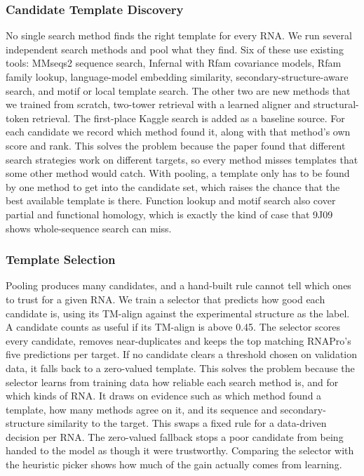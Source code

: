 \documentclass{FastFyp}
\begin{document}
\subsubsection{Candidate Template Discovery}
No single search method finds the right template for every RNA. We run several independent search methods and pool what they find. Six of these use existing tools: MMseqs2 sequence search, Infernal with Rfam covariance models, Rfam family lookup, language-model embedding similarity, secondary-structure-aware search, and motif or local template search. The other two are new methods that we trained from scratch, two-tower retrieval with a learned aligner and structural-token retrieval. The first-place Kaggle search is added as a baseline source. For each candidate we record which method found it, along with that method's own score and rank. This solves the problem because the paper found that different search strategies work on different targets, so every method misses templates that some other method would catch. With pooling, a template only has to be found by one method to get into the candidate set, which raises the chance that the best available template is there. Function lookup and motif search also cover partial and functional homology, which is exactly the kind of case that 9J09 shows whole-sequence search can miss.

\subsubsection{Template Selection}
Pooling produces many candidates, and a hand-built rule cannot tell which ones to trust for a given RNA. We train a selector that predicts how good each candidate is, using its TM-align against the experimental structure as the label. A candidate counts as useful if its TM-align is above 0.45. The selector scores every candidate, removes near-duplicates and keeps the top matching RNAPro's five predictions per target. If no candidate clears a threshold chosen on validation data, it falls back to a zero-valued template. This solves the problem because the selector learns from training data how reliable each search method is, and for which kinds of RNA. It draws on evidence such as which method found a template, how many methods agree on it, and its sequence and secondary-structure similarity to the target. This swaps a fixed rule for a data-driven decision per RNA. The zero-valued fallback stops a poor candidate from being handed to the model as though it were trustworthy. Comparing the selector with the heuristic picker shows how much of the gain actually comes from learning.
\end{document}
